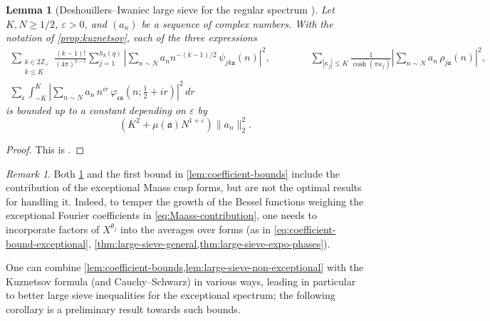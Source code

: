\documentclass[reqno,11pt]{amsart}
\newtheorem{knownlemma}[knowntheorem]{Lemma}
\theoremstyle{remark}
\newtheorem*{remark}{Remark}
\numberwithin{equation}{section}
\newcommand{\Z}{\mathbb{Z}}
\newcommand{\ma}{\mathfrak{a}}
\newcommand{\mc}{\mathfrak{c}}
\newcommand{\eps}{\varepsilon}
\newcommand{\ch}{\cosh}
\begin{document}
\begin{knownlemma}[Deshouillers--Iwaniec large sieve for the regular spectrum \cite{deshouillers1982kloosterman}] \label{lem:large-sieve-non-exceptional}
Let $K, N \ge 1/2$, $\eps > 0$, and $(a_n)$ be a sequence of complex numbers. With the notation of \cref{prop:kuznetsov}, each of the three expressions
\begin{gather*}
    \sum_{\substack{k \in 2\Z_+ \\ k \le K}} \frac{(k-1)!}{(4\pi)^{k-1}} \sum_{j = 1}^{h_k(q)} \left\vert \sum_{n \sim N} a_n n^{-(k-1)/2}\, \psi_{jk\ma}(n) \right\vert ^2,
    \qquad\qquad 
    \sum_{|\kappa_j| \le K} \frac{1}{\ch(\pi \kappa_j)} \left\vert \sum_{n \sim N} a_n\, \rho_{j\ma}(n) \right\vert^2,
    \\
    \sum_{\mc} \int_{-K}^K \left\vert \sum_{n \sim N} a_n\, n^{ir}\, \varphi_{\mc\ma}\left(n; \frac{1}{2} + ir\right) \right\vert^2\, dr
\end{gather*}
is bounded up to a constant depending on $\eps$ by 
\[
    \left(K^2 + \mu(\ma) N^{1+\eps} \right) \|a_n\|_2^2.
\]
\end{knownlemma}

\begin{proof}
This is \cite[Theorem 2]{deshouillers1982kloosterman}.
\end{proof}

\begin{remark}
Both \cref{lem:large-sieve-non-exceptional} and the first bound in \cref{lem:coefficient-bounds} include the contribution of the exceptional Maass cusp forms, but are not the optimal results for handling it. Indeed, to temper the growth of the Bessel functions weighing the exceptional Fourier coefficients in \cref{eq:Maass-contribution}, one needs to incorporate factors of $X^{\theta_j}$ into the averages over forms (as in \cref{eq:coefficient-bound-exceptional}, \cref{thm:large-sieve-general,thm:large-sieve-expo-phases}).
\end{remark}


One can combine \cref{lem:coefficient-bounds,lem:large-sieve-non-exceptional} with the Kuznetsov formula (and Cauchy--Schwarz) in various ways, leading in particular to better large sieve inequalities for the exceptional spectrum; the following corollary is a preliminary result towards such bounds.
\end{document}
